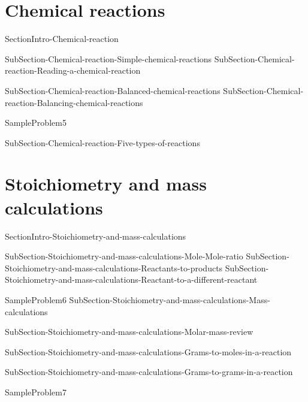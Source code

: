 \documentclass[main.tex]{subfiles}
\begin{document}
\section{Chemical reactions}
{SectionIntro-Chemical-reaction}

\sloppy\begin{description}


{SubSection-Chemical-reaction-Simple-chemical-reactions}
{SubSection-Chemical-reaction-Reading-a-chemical-reaction}




{SubSection-Chemical-reaction-Balanced-chemical-reactions}
{SubSection-Chemical-reaction-Balancing-chemical-reactions}





{SampleProblem5}


{SubSection-Chemical-reaction-Five-types-of-reactions}


\end{description}



\section{Stoichiometry and mass calculations}
{SectionIntro-Stoichiometry-and-mass-calculations}


\sloppy \begin{description}

{SubSection-Stoichiometry-and-mass-calculations-Mole-Mole-ratio}
{SubSection-Stoichiometry-and-mass-calculations-Reactants-to-products}
{SubSection-Stoichiometry-and-mass-calculations-Reactant-to-a-different-reactant}








{SampleProblem6}
{SubSection-Stoichiometry-and-mass-calculations-Mass-calculations}

{SubSection-Stoichiometry-and-mass-calculations-Molar-mass-review}


{SubSection-Stoichiometry-and-mass-calculations-Grams-to-moles-in-a-reaction}




{SubSection-Stoichiometry-and-mass-calculations-Grams-to-grams-in-a-reaction}


{SampleProblem7}

\end{description}
\end{document}
